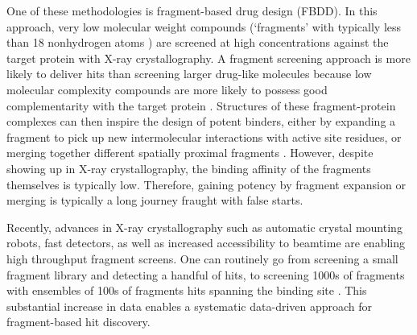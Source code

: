 One of these methodologies is fragment-based drug design (FBDD). In this approach, very low molecular weight compounds (`fragments' with typically less than 18 nonhydrogen atoms \cite{David2017FBLD}) are screened at high concentrations against the target protein with X-ray crystallography. A fragment screening approach is more likely to deliver hits than screening larger drug-like molecules because low molecular complexity compounds are more likely to possess good complementarity with the target protein \cite{hann2001molecular}. Structures of these fragment-protein complexes can then inspire the design of potent binders, either by expanding a fragment to pick up new intermolecular interactions with active site residues, or merging together different spatially proximal fragments \cite{Ichihara2011FragLinking, Yu2021FragLinkingEntropy}. However, despite showing up in X-ray crystallography, the binding affinity of the fragments themselves is typically low. Therefore, gaining potency by fragment expansion or merging is typically a long journey fraught with false starts. 



Recently, advances in X-ray crystallography such as automatic crystal mounting robots, fast detectors, as well as increased accessibility to beamtime are enabling high throughput fragment screens. One can routinely go from screening a small fragment library and detecting a handful of hits, to screening 1000s of fragments with ensembles of 100s of fragments hits spanning the binding site \cite{Schiebel2016HighThroughput, Douangamath2020XChem}. This substantial increase in data enables a systematic data-driven approach for fragment-based hit discovery. 


